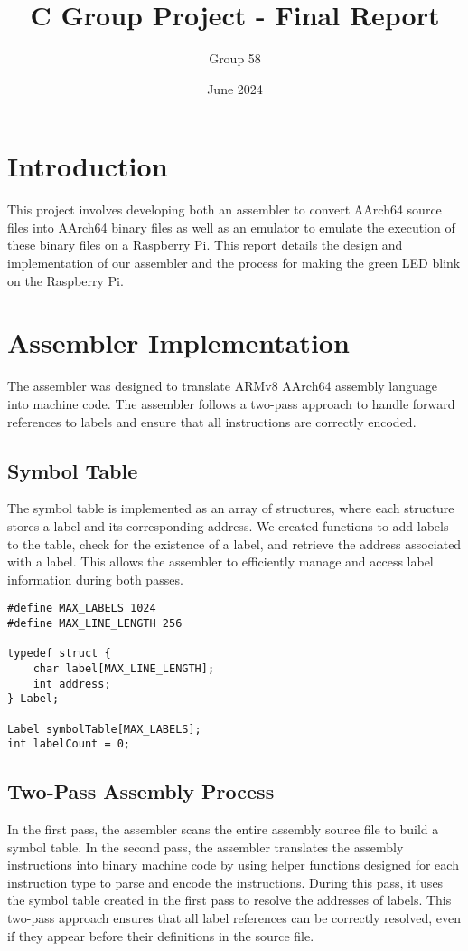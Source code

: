 \documentclass[a4paper, 10pt]{article}
\title{C Group Project - Final Report}
\author{Group 58}
\date{June 2024}
\begin{document}
\maketitle



\section{Introduction}
This project involves developing both an assembler to convert AArch64 source files into AArch64 binary files as well as an emulator to emulate the execution of these binary files on a Raspberry Pi. This report details the design and implementation of our assembler and the process for making the green LED blink on the Raspberry Pi.
\newline
\section{Assembler Implementation}
The assembler was designed to translate ARMv8 AArch64 assembly language into machine code. The assembler follows a two-pass approach to handle forward references to labels and ensure that all instructions are correctly encoded.

\subsection{Symbol Table}
The symbol table is implemented as an array of structures, where each structure stores a label and its corresponding address. We created functions to add labels to the table, check for the existence of a label, and retrieve the address associated with a label. This allows the assembler to efficiently manage and access label information during both passes.

\begin{verbatim}
#define MAX_LABELS 1024
#define MAX_LINE_LENGTH 256

typedef struct {
    char label[MAX_LINE_LENGTH];
    int address;
} Label;

Label symbolTable[MAX_LABELS];
int labelCount = 0;
\end{verbatim}

\subsection{Two-Pass Assembly Process}

In the first pass, the assembler scans the entire assembly source file to build a symbol table. In the second pass, the assembler translates the assembly instructions into binary machine code by using helper functions designed for each instruction type to parse and encode the instructions. During this pass, it uses the symbol table created in the first pass to resolve the addresses of labels. This two-pass approach ensures that all label references can be correctly resolved, even if they appear before their definitions in the source file.
\end{document}
